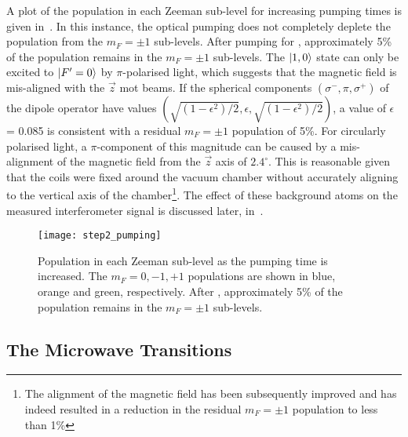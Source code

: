 \par\noindent
A plot of the population in each Zeeman sub-level for increasing
pumping times is given in~. In this
instance, the optical pumping does not completely deplete the
population from the \(m_F = \pm 1\) sub-levels. After pumping for
, approximately 5\% of the population
remains in the \(m_F = \pm 1\) sub-levels. The \(\ket{1,0}\) state can
only be excited to \(\ket{F'=0}\) by \(\pi\)-polarised light, which
suggests that the magnetic field is mis-aligned with the \(\vec{z}\)
\ac{mot} beams. If the spherical components $(\sigma^-,\pi,\sigma^+)$
of the dipole operator have values
$(\sqrt{(1-\epsilon^2)/2},\epsilon,
\sqrt{(1-\epsilon^2)/2})$, a value of $\epsilon$ = 0.085 is consistent
with a residual $m_F = \pm 1$ population of 5\%. For circularly
polarised light, a $\pi$-component of this magnitude can be caused by
a mis-alignment of the magnetic field from the $\vec{z}$ axis of
$2.4^\circ$. This is reasonable given that the coils were fixed around
the vacuum chamber without accurately aligning to
the vertical axis of the chamber\footnote{The alignment of the
  magnetic field has been subsequently improved and has indeed
  resulted in a reduction in the residual $m_F = \pm 1$ population to
less than 1\%}.
The effect of these background atoms on the measured
interferometer signal is discussed later,
in~.
\begin{figure}[!htbp]
    \centering
    \texttt{[image: step2\_pumping]}
    \caption[\(\ket{1,m_F}\) populations for increasing 
    pumping time.]{Population in each Zeeman sub-level as the
     pumping time is increased. The \(m_F = 0, -1, +1\)
  populations are shown in blue, orange and green, respectively. After , approximately 5\% of the population remains in the \(m_F = \pm 1\) sub-levels.}
  \label{fig:step2_pumping}
\end{figure}
\subsection{The Microwave Transitions}\label{subsec:microwaves}
